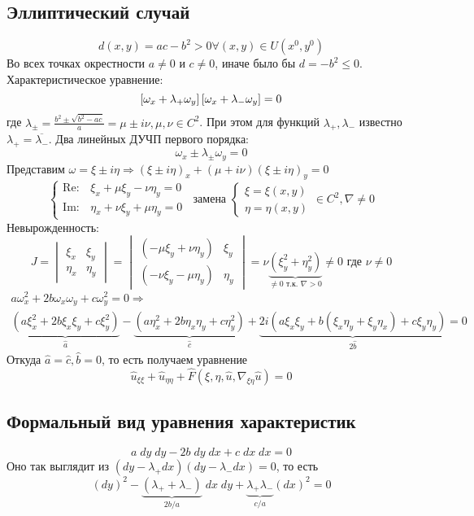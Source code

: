 \documentclass[../main.tex]{subfiles}
\begin{document}
\subsection{Эллиптический случай}
$$
d(x, y) = ac - b^2 > 0 \forall (x, y) \in U(x^0, y^0)
$$
Во всех точках окрестности $a\ne 0$ и $c\ne 0$, иначе было бы $d = -b^2 \leq 0$. Характеристическое уравнение:
$$
\left[\omega_x + \lambda_+\omega_y\right]\left[\omega_x + \lambda_-\omega_y\right] = 0
$$
где $\lambda_\pm = \frac{b^2\pm\sqrt{b^2 - ac}}{a} = \mu \pm i\nu, \mu, \nu \in C^2$. При этом для функций $\lambda_+, \lambda_-$ известно $\lambda_+ = \overline{\lambda_-}$. Два линейных ДУЧП первого порядка:
$$
\omega_x \pm \lambda_\pm\omega_y = 0
$$
Представим $\omega = \xi \pm i\eta \Rightarrow
(\xi \pm i\eta)_x + (\mu + i\nu)(\xi \pm i\eta)_y = 0$
$$
\begin{cases}
    \mathrm{Re:} & \xi_x + \mu\xi_y - \nu\eta_y = 0\\
    \mathrm{Im:} & \eta_x + \nu\xi_y + \mu\eta_y = 0
\end{cases}\;\;\text{замена }
\begin{cases}
    \xi = \xi(x, y) \\
    \eta = \eta(x, y)
\end{cases} \in C^2, \nabla \ne 0
$$
Невырожденность:
$$ J = 
\begin{vmatrix}
    \xi_x & \xi_y \\
    \eta_x & \eta_y
\end{vmatrix} =
\begin{vmatrix}
    (-\mu\xi_y + \nu\eta_y) & \xi_y \\
    (-\nu\xi_y - \mu\eta_y) & \eta_y
\end{vmatrix} =
\nu\underbrace{(\xi_y^2 + \eta_y^2)}_{\ne 0 \text{ т.к. }\nabla > 0} \ne 0 \text{ где }\nu \ne 0
$$
\begin{multline*}
a\omega_x^2 + 2b\omega_x\omega_y + c\omega_y^2 = 0 \Rightarrow \\
\underbrace{(a\xi^2_x + 2b\xi_x\xi_y + c\xi_y^2)}_{\hat a} -
\underbrace{(a\eta_x^2 + 2b\eta_x\eta_y + c\eta_y^2)}_{\hat c}+ 
\underbrace{2i(a\xi_x\xi_y + b(\xi_x\eta_y + \xi_y\eta_x) + c\xi_y\eta_y)}_{2\hat b} = 0
\end{multline*}
Откуда $\hat a = \hat c, \hat b = 0$, то есть получаем уравнение
$$
\hat u_{\xi\xi} + \hat u_{\eta\eta} + \hat F(\xi, \eta, \hat u, \nabla_{\xi\eta}\hat u) = 0
$$
\subsection{Формальный вид уравнения характеристик}
$$
a\;dy\;dy - 2b\;dy\;dx + c\;dx\;dx =0
$$
Оно так выглядит из $(dy - \lambda_+dx)(dy - \lambda_-dx)=0$, то есть 
$$
(dy)^2 - \underbrace{(\lambda_+ + \lambda_-)}_{2b/a}\;dx\;dy + \underbrace{\lambda_+\lambda_-}_{c/a}(dx)^2 = 0
$$
\end{document}
